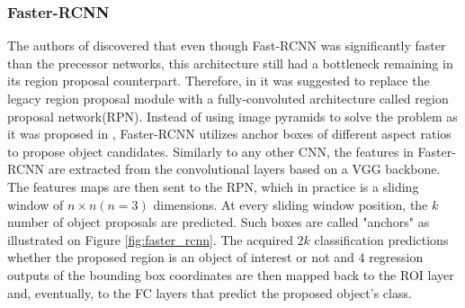 \documentclass[english, 12pt, a4paper, elec, utf8, a-1b, online]{aaltothesis}
\begin{document}
\subsubsection{Faster-RCNN}
The authors of \cite{ima} discovered that even though Fast-RCNN was significantly faster than the precessor networks, this architecture still had a bottleneck remaining in its region proposal counterpart. Therefore, in \cite{ima} it was suggested to replace the legacy region proposal module with a fully-convoluted architecture called region proposal network(RPN)\cite{Girshick2013}. Instead of using image pyramids to solve the problem as it was proposed in \cite{Girshick2015}, Faster-RCNN \cite{ima} utilizes anchor boxes of different aspect ratios to propose object candidates. Similarly to any other CNN, the features in Faster-RCNN are extracted from the convolutional layers based on a VGG backbone. The features maps are then sent to the RPN, which in practice is a sliding window  of $n\times n (n=3)$ dimensions. At every sliding window position, the $k$ number of object proposals are predicted. Such boxes are called "anchors" as illustrated on Figure \ref{fig:faster_rcnn}. The acquired $2k$ classification predictions whether the proposed region is an object of interest or not and $4$ regression outputs of the bounding box coordinates are then mapped back to the ROI layer and, eventually, to the FC layers that predict the proposed object's class. \cite{ima}
\end{document}

